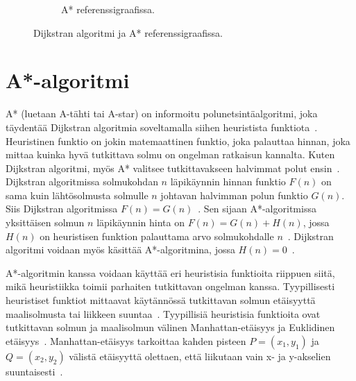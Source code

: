 \begin{figure}
\begin{subfigure}[b]{0.5\textwidth}
		\caption{A* referenssigraafissa.}\label{refAStar}
	\end{subfigure}
	\caption{Dijkstran algoritmi ja A* referenssigraafissa.}\label{DijkstraAStarFigs}
\end{figure}

\section{A*-algoritmi}\label{aStar}
A* (luetaan A-tähti tai A-star) on informoitu polunetsintäalgoritmi, joka 
täydentää Dijkstran algoritmia soveltamalla siihen heuristista 
funktiota~\cite{MathewAndMalathy}. Heuristinen funktio on jokin matemaattinen 
funktio, joka palauttaa hinnan, joka mittaa kuinka hyvä tutkittava solmu on 
ongelman ratkaisun kannalta. Kuten Dijkstran algoritmi, myös A* valitsee 
tutkittavakseen halvimmat polut ensin~\cite{DelaunayVoronoiAStar}. Dijkstran 
algoritmissa solmukohdan $n$ läpikäynnin hinnan funktio $F(n)$ on sama kuin 
lähtösolmusta solmulle $n$ johtavan halvimman polun funktio $G(n)$. Siis 
Dijkstran algoritmissa $F(n) = G(n)$~\cite{MathewAndMalathy}. Sen sijaan 
A*-algoritmissa yksittäisen solmun $n$ läpikäynnin hinta on 
$F(n) = G(n) + H(n)$, jossa $H(n)$ on heuristisen funktion palauttama arvo 
solmukohdalle $n$~\cite{DelaunayVoronoiAStar}. Dijkstran algoritmi voidaan myös 
käsittää A*-algoritmina, jossa $H(n) = 0$~\cite{MathewAndMalathy}.\par 
	A*-algoritmin kanssa voidaan käyttää eri heuristisia funktioita 
riippuen siitä, mikä heuristiikka toimii parhaiten tutkittavan ongelman 
kanssa. Tyypillisesti heuristiset funktiot mittaavat käytännössä tutkittavan 
solmun etäisyyttä maalisolmusta tai liikkeen suuntaa~\cite{ProcediaAStar}. 
Tyypillisiä heuristisia funktioita ovat tutkittavan solmun ja maalisolmun 
välinen Manhattan-etäisyys ja Euklidinen etäisyys~\cite{MathewAndMalathy}. 
Manhattan-etäisyys tarkoittaa kahden pisteen $P = (x_1,y_1)$ ja 
$Q = (x_2,y_2)$ välistä etäisyyttä olettaen, että liikutaan vain x- ja 
y-akselien suuntaisesti~\cite{MathewAndMalathy}.

